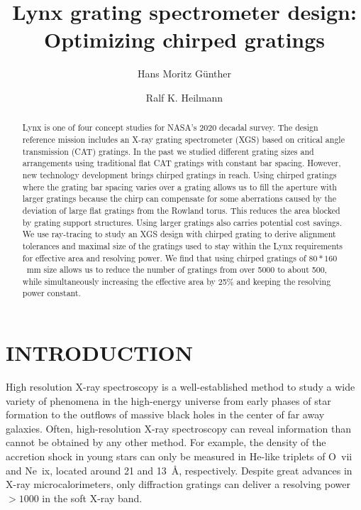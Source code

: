 \documentclass[]{spie}  %
\title{Lynx grating spectrometer design: Optimizing chirped gratings}
\author[a]{Hans Moritz G\"unther}
\author[a,b]{Ralf K. Heilmann}
\affil[a]{MIT Kavli Institute for Astrophysics and Space Research, Massachusetts Institute of Technology, Cambridge, MA 02139, USA}
\affil[b]{Space Nanotechnology Laboratory, Massachusetts Institute of Technology, Cambridge, MA 02139, USA}
\begin{document}
 
\maketitle

\begin{abstract}
Lynx is one of four concept studies for NASA's 2020 decadal survey. The design reference mission includes an X-ray grating spectrometer (XGS) based on critical angle transmission (CAT) gratings. In the past we studied different grating sizes and arrangements using traditional flat CAT gratings with constant bar spacing. However, new technology development brings chirped gratings in reach. Using chirped gratings where the grating bar spacing varies over a grating allows us to fill the aperture with larger gratings because the chirp can compensate for some aberrations caused by the deviation of large flat gratings from the Rowland torus. This reduces the area blocked by grating support structures. Using larger gratings also carries potential cost savings.
We use ray-tracing to study an XGS design with chirped grating to derive alignment tolerances and maximal size of the gratings used to stay within the Lynx requirements for effective area and resolving power. We find that using chirped gratings of $80 * 160$~mm size allows us to reduce the number of gratings from over 5000 to about 500, while simultaneously increasing the effective area by 25\% and keeping the resolving power constant.

\end{abstract}


\section{INTRODUCTION}
\label{sec:intro}
High resolution X-ray spectroscopy is a well-established method to study a wide variety of phenomena in the high-energy universe from early phases of star formation to the outflows of massive black holes in the center of far away galaxies. Often, high-resolution X-ray spectroscopy can reveal information than cannot be obtained by any other method. For example, the density of the accretion shock in young stars can only be measured in He-like triplets of O~{\sc vii} and Ne~{\sc ix}, located around 21 and 13~\AA{}, respectively. Despite great advances in X-ray microcalorimeters, only diffraction gratings can deliver a resolving power $> 1000$ in the soft X-ray band.
\end{document}
